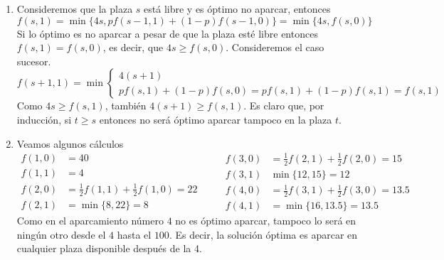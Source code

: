 \documentclass[twoside]{article}
\begin{document}
\begin{ejercicio}{1}
\begin{solucion}
\begin{enumerate}
\item Consideremos que la plaza $s$ está libre y es óptimo no aparcar, entonces
$$f(s,1)=\min{\{4s,pf(s-1,1)+(1-p)f(s-1,0)\}}=\min{\{4s,f(s,0)\}}$$
Si lo óptimo es no aparcar a pesar de que la plaza esté libre entonces $f(s,1)=f(s,0)$, es decir, que $4s\geq f(s,0)$. Consideremos el caso sucesor. 
$$f(s+1,1)=\min\begin{cases}
4(s+1)\\
pf(s,1)+(1-p)f(s,0)=pf(s,1)+(1-p)f(s,1)=f(s,1)
\end{cases}$$
Como $4s\geq f(s,1)$, también $4(s+1)\geq f(s,1)$. Es claro que, por inducción, si $t\geq s$ entonces no será óptimo aparcar tampoco en la plaza $t$.

\item Veamos algunos cálculos
\begin{equation*}
  \begin{split}
    f(1,0)&=40\\
    f(1,1)&= 4\\
    f(2,0)&= \frac{1}{2}f(1,1)+\frac{1}{2}f(1,0)=22\\
    f(2,1)& = \min{\{8,22\}}= 8
  \end{split}
\quad\quad
  \begin{split}
    f(3,0)&=\frac{1}{2}f(2,1)+\frac{1}{2}f(2,0) = 15\\
    f(3,1)&\min\{12,15\}=12\\
    f(4,0)& = \frac{1}{2}f(3,1)+\frac{1}{2}f(3,0)=13.5\\
    f(4,1)&= \min\{16,13.5\} = 13.5
  \end{split}
\end{equation*}
Como en el aparcamiento número $4$ no es óptimo aparcar, tampoco lo será en ningún otro desde el $4$ hasta el $100$. Es decir, la solución óptima es aparcar en cualquier plaza disponible después de la 4.


\end{enumerate}
\end{solucion}
\end{ejercicio}
\end{document}

